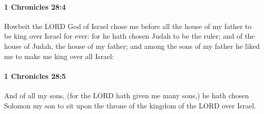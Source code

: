 		\paragraph{1 Chronicles 28:4} %
			\label{1CHRONICLES-28-4}

			Howbeit the LORD God of Israel chose me before all the house of my father to be king over Israel for ever: for he hath chosen Judah to be the ruler; and of the house of Judah, the house of my father; and among the sons of my father he liked me to make me king over all Israel:


		\paragraph{1 Chronicles 28:5} %
			\label{1CHRONICLES-28-5}

			And of all my sons, (for the LORD hath given me many sons,) he hath chosen Solomon my son to sit upon the throne of the kingdom of the LORD over Israel.

